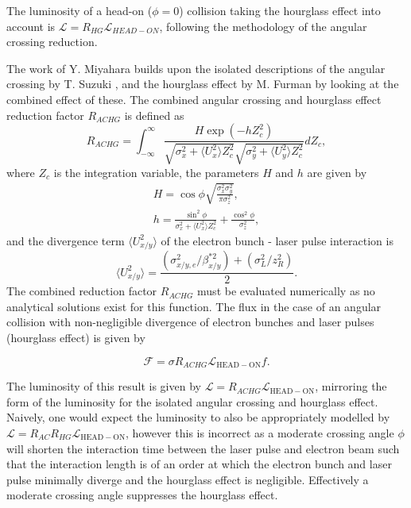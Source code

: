 \documentclass[../main.tex]{subfiles}
\begin{document}
The luminosity of a head-on ($\phi = 0$) collision taking the hourglass effect into account is $\mathcal{L} = R_{HG}\mathcal{L}_{HEAD-ON}$, following the methodology of the angular crossing reduction.

The work of Y. Miyahara \cite{miyahara2008luminosity} builds upon the isolated descriptions of the angular crossing by T. Suzuki \cite{suzuki1976general}, and the hourglass effect by M. Furman \cite{furman1991hourglas} by looking at the combined effect of these. The combined angular crossing and hourglass effect reduction factor $R_{ACHG}$ is defined as
\begin{equation}
R_{ACHG} = \int_{-\infty}^{\infty}\frac{H\exp\left(-hZ_{c}^{2}\right)}{\sqrt{\sigma_{x}^{2}+\langle U_{x}^2\rangle Z_{c}^{2}}\sqrt{\sigma_{y}^{2}+\langle U_{y}^{2}\rangle Z_{c}^{2}}}dZ_{c},
\label{eq:miyahara_combined_reduction}    
\end{equation}
where $Z_{c}$ is the integration variable, the parameters $H$ and $h$ are given by
\begin{gather}
H = \cos\phi\sqrt{\frac{\sigma_{x}^{2}\sigma_{y}^{2}}{\pi\sigma_{z}^{2}}},
\label{eq:miyahara_H_parameter} \\
h = \frac{\sin^{2}\phi}{\sigma_{x}^{2}+\langle U_{x}^{2}\rangle Z_{c}^{2}}+\frac{\cos^{2}\phi}{\sigma_{z}^{2}},
\label{eq:miyahara_h_parameter}
\end{gather}
and the divergence term $\langle U_{x/y}^{2}\rangle$ of the electron bunch - laser pulse interaction is
\begin{equation}
\langle U_{x/y}^{2}\rangle = \frac{\left(\sigma_{x/y,e}^{2}/\beta_{x/y}^{*2}\right)+\left(\sigma_{L}^{2}/z_{R}^{2}\right)}{2}.    
\end{equation}
The combined reduction factor $R_{ACHG}$ must be evaluated numerically as no analytical solutions exist for this function. The flux in the case of an angular collision with non-negligible divergence of electron bunches and laser pulses (hourglass effect) is given by

\begin{equation}
\mathcal{F} = \sigma R_{ACHG}\mathcal{L}_{\mathrm{HEAD-ON}}f.
\label{eq:flux_angular_crossing_hourglass}
\end{equation}

The luminosity of this result is given by $\mathcal{L} = R_{ACHG}\mathcal{L}_{\mathrm{HEAD-ON}}$, mirroring the form of the luminosity for the isolated angular crossing and hourglass effect. Naively, one would expect the luminosity to also be appropriately modelled by $\mathcal{L} = R_{AC}R_{HG}\mathcal{L}_{\mathrm{HEAD-ON}}$, however this is incorrect as a moderate crossing angle $\phi$ will shorten the interaction time between the laser pulse and electron beam such that the interaction length is of an order at which the electron bunch and laser pulse minimally diverge and the hourglass effect is negligible. Effectively a moderate crossing angle suppresses the hourglass effect.   
\end{document}
